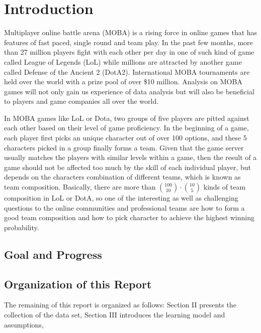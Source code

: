\documentclass[conference]{IEEEtran}
\begin{document}
\section{Introduction}

Multiplayer online battle arena (MOBA) is a rising force in online games that has features of fast paced, single round and team play. In the past few months, more than 27 million players fight with each other per day in one of such kind of game called League of Legends (LoL)\cite{Ian} while millions are attracted by another game called Defense of the Ancient 2 (DotA2). International MOBA tournaments are held over the world with a prize pool of over \$10 million\cite{Valve}.  Analysis on MOBA games will not only gain us experience of data analysis but will also be beneficial to players and game companies all over the world.

In MOBA games like LoL or Dota, two groups of five players are pitted against each other based on their level of game proficiency. In the beginning of a game, each player first picks an unique character out of over 100 options, and these 5 characters picked in a group finally forms a team. Given that the game server usually matches the players with similar levels within a game, then the result of a game should not be affected too much by the skill of each individual player, but depends on the characters combination of different teams, which is known as team composition. Basically, there are more than $\binom{100}{10}\cdot\binom{10}{5}$ kinds of team composition in LoL or DotA, so one of the interesting as well as challenging questions to the online communities and professional teams are how to form a good team composition and how to pick character to achieve the highest winning probability.

\subsection{Goal and Progress}



\subsection{Organization of this Report}
The remaining of this report is organized as follows: Section II presents the collection of the data set, Section III introduces the learning model and assumptions,
\end{document}
